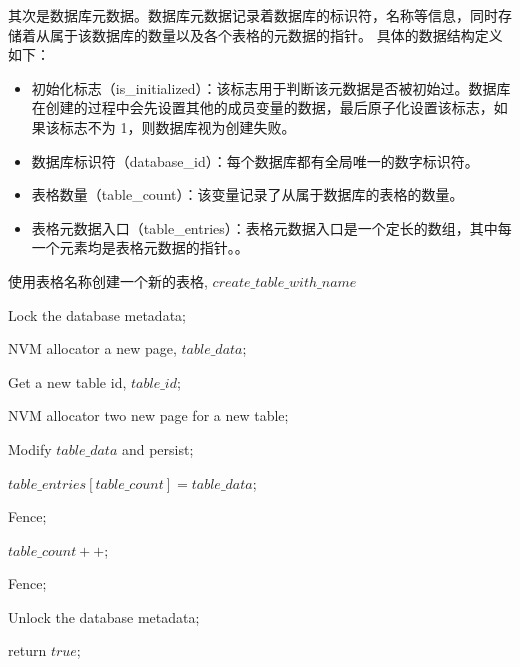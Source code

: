 其次是数据库元数据。数据库元数据记录着数据库的标识符，名称等信息，同时存储着从属于该数据库的数量以及各个表格的元数据的指针。
具体的数据结构定义如下：
\begin{itemize}
    \item 初始化标志（is\_initialized）：该标志用于判断该元数据是否被初始过。数据库在创建的过程中会先设置其他的成员变量的数据，最后原子化设置该标志，如果该标志不为 1，则数据库视为创建失败。
    \item 数据库标识符（database\_id）：每个数据库都有全局唯一的数字标识符。
    \item 表格数量（table\_count）：该变量记录了从属于数据库的表格的数量。
    \item 表格元数据入口（table\_entries）：表格元数据入口是一个定长的数组，其中每一个元素均是表格元数据的指针。。
\end{itemize}


\begin{algorithm}[ht]
    \caption{使用表格名称创建一个新的表格, $create\_table\_with\_name$}
    \label{alg:create-table}
    \BlankLine
    Lock the database metadata;


    NVM allocator a new page, $table\_data$;

    Get a new table id, $table\_id$;

    NVM allocator two new page for a new table;

    Modify $table\_data$ and persist;

    $table\_entries[table\_count] = table\_data$;

    Fence;

    $table\_count++$;

    Fence;

    Unlock the database metadata;

    return $true$;
\end{algorithm}


